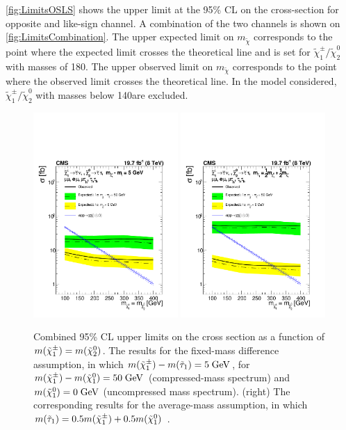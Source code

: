  \autoref{fig:LimitsOSLS}  shows the upper limit at the 95\% CL on the cross-section for opposite and like-sign channel. A combination of the two channels is shown on \autoref{fig:LimitsCombination}. The upper expected limit on $m_{\tilde{\chi}}$ corresponds to the point where the expected limit crosses the theoretical line and is set for  $\tilde{\chi}_{1}^{\pm} /\tilde{\chi}_{2}^{0} $ with masses of 180\gev. The upper observed limit on $m_{\tilde{\chi}}$ corresponds to the point where the observed limit crosses the theoretical line. In the model considered, $\tilde{\chi}_{1}^{\pm} /\tilde{\chi}_{2}^{0} $ with masses below 140\gev are excluded.

\begin{figure}
	\begin{center}
		\includegraphics[width=0.49\textwidth]{PLOTS/CMS-SUS-14-005_Figure_006-a.pdf}
		\includegraphics[width=0.49\textwidth]{PLOTS/CMS-SUS-14-005_Figure_006-b.pdf}
		\caption{Combined 95\% CL upper limits on the cross section as a function of $m(\tilde{\chi}^{\pm}_{1}) = m(\tilde{\chi}^{0}_{2})$. The results for the fixed-mass difference assumption, in which $m(\tilde{\chi}^{\pm}_{1}) - m(\tilde{\tau}_{1}) = 5\;\text{Ge}\kern-0.06667em\text{V}$, for $m(\tilde{\chi}^{\pm}_{1}) - m(\tilde{\chi}^{0}_{1}) = 50\;\text{Ge}\kern-0.06667em\text{V}$ (compressed-mass spectrum) and $m(\tilde{\chi}^{0}_{1}) = 0\;\text{Ge}\kern-0.06667em\text{V}$ (uncompressed mass spectrum). (right) The corresponding results for the average-mass assumption, in which $m(\tilde{\tau}_{1}) = 0.5 m(\tilde{\chi}^{\pm}_{1}) + 0.5m(\tilde{\chi}^{0}_{1})$ \cite{Khachatryan:2015kxa}.}
		\label{fig:Limits_combined}
	\end{center}
\end{figure}

